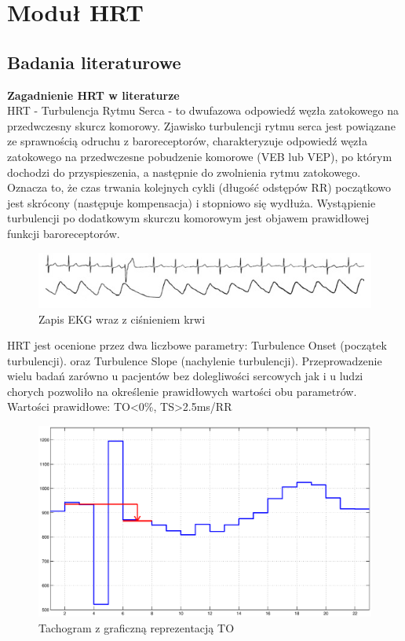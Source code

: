 
\section{Moduł HRT}
\subsection{Badania literaturowe}

\textbf{Zagadnienie HRT w literaturze}\\
HRT - Turbulencja Rytmu Serca - to dwufazowa odpowiedź węzła zatokowego na przedwczesny skurcz komorowy. Zjawisko turbulencji rytmu serca jest powiązane ze sprawnością odruchu z baroreceptorów,  charakteryzuje odpowiedź węzła zatokowego na przedwczesne pobudzenie komorowe (VEB lub VEP), po którym dochodzi do przyspieszenia, a następnie do zwolnienia rytmu zatokowego. Oznacza to, że czas trwania kolejnych cykli (długość odstępów RR)  początkowo jest skrócony (następuje kompensacja) i stopniowo się wydłuża. Wystąpienie turbulencji po dodatkowym skurczu komorowym jest objawem prawidłowej funkcji baroreceptorów.\\
\begin{figure}[!h]
\centerline{\includegraphics[scale=0.8]{HRT/rys1.jpg}}
\caption{Zapis EKG wraz z ciśnieniem krwi}
\end{figure}


HRT jest ocenione przez dwa liczbowe parametry: Turbulence Onset (początek turbulencji).  oraz Turbulence Slope (nachylenie turbulencji). Przeprowadzenie wielu badań zarówno u pacjentów bez dolegliwości sercowych jak i u ludzi chorych pozwoliło na określenie prawidłowych wartości obu parametrów.
\\Wartości prawidłowe: TO<0\%, TS>2.5ms/RR\\

\begin{figure}[!ht]
\centerline{\includegraphics[scale=0.32]{HRT/HRT2.eps}}
\caption{Tachogram z graficzną reprezentacją TO}
\end{figure}

